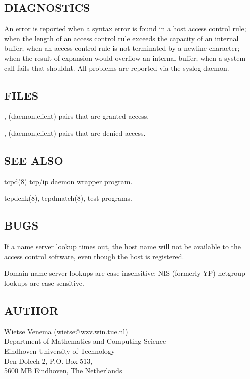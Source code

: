 \documentclass[11pt,twoside,onecolumn]{book}
\begin{document}
\subsection*{DIAGNOSTICS}

An error is reported when a syntax error is found in a host access
control rule; when the length of an access control rule exceeds the
capacity of an internal buffer; when an access control rule is not
terminated by a newline character; when the result of %
expansion would overflow an internal buffer; when a system call fails
that shouldn\'t.  All problems are reported via the syslog daemon.


\subsection*{FILES}

, (daemon,client) pairs that are granted access.

, (daemon,client) pairs that are denied access.

\subsection*{SEE ALSO}

\noindent tcpd(8) tcp/ip daemon wrapper program.

\noindent tcpdchk(8), tcpdmatch(8), test programs.

\subsection*{BUGS}

If a name server lookup times out, the host name will not be available
to the access control software, even though the host is registered.

Domain name server lookups are case insensitive; NIS (formerly YP)
netgroup lookups are case sensitive.

\subsection*{AUTHOR}

Wietse Venema (wietse@wzv.win.tue.nl)\\
Department of Mathematics and Computing Science\\
Eindhoven University of Technology\\
Den Dolech 2, P.O. Box 513,\\
5600 MB Eindhoven, The Netherlands\\
\end{document}
